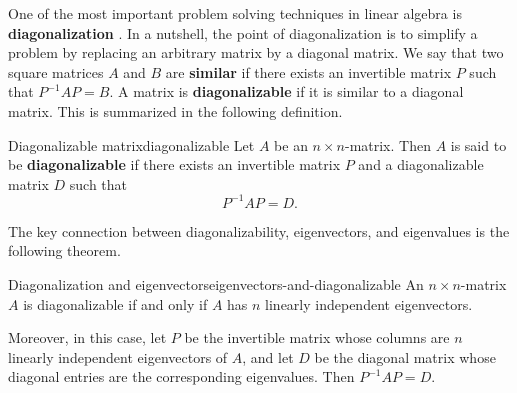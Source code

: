 One of the most important problem solving techniques in linear algebra
is \textbf{diagonalization}%
%
. In a nutshell, the point of
diagonalization is to simplify a problem by replacing an arbitrary
matrix by a diagonal matrix. We say that two square matrices $A$ and
$B$ are \textbf{similar}%
%
 if there exists an invertible matrix $P$ such
that $P^{-1}AP = B$. A matrix is \textbf{diagonalizable}%
%
 if it is similar to a diagonal matrix.
This is summarized in the following definition.

\begin{definition}{Diagonalizable matrix}{diagonalizable}
  Let $A$ be an $n\times n$-matrix. Then $A$ is said to be
  \textbf{diagonalizable}%
   if there exists an invertible matrix
  $P$ and a diagonalizable matrix $D$ such that
  \begin{equation*}
    P^{-1}AP=D.
  \end{equation*}
\end{definition}

The key connection between diagonalizability, eigenvectors, and
eigenvalues is the following theorem.

\begin{theorem}{Diagonalization and eigenvectors}{eigenvectors-and-diagonalizable}
  An $n\times n$-matrix $A$ is diagonalizable if and only if $A$ has
  $n$ linearly independent eigenvectors.
  \bigskip

  Moreover, in this case, let $P$ be the invertible matrix whose
  columns are $n$ linearly independent eigenvectors of $A$, and let
  $D$ be the diagonal matrix whose diagonal entries are the
  corresponding eigenvalues. Then $P^{-1}AP=D$.
\end{theorem}

